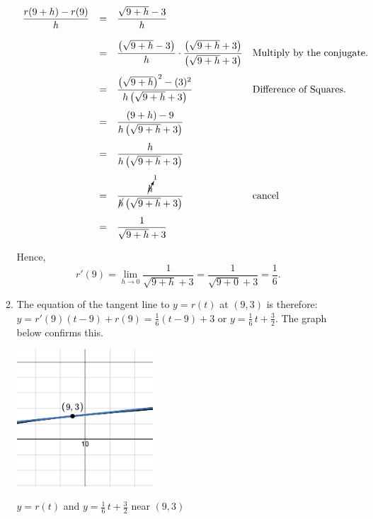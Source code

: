 \documentclass{ximera}
\begin{document}
\begin{example}
\begin{enumerate}
\begin{enumerate}
\[\begin{array}{rcll}
\dfrac{r(9+h) - r(9)}{h} & = & \dfrac{\sqrt{9+h} - 3}{h} & \\[15pt]
												
												 & = & \dfrac{\left(\sqrt{9+h} - 3 \right)}{h} \cdot \dfrac{\left(\sqrt{9+h} + 3\right)}{\left(\sqrt{9+h} + 3\right)} & \text{Multiply by the conjugate.} \\[15pt]
										
												 & = &  \dfrac{\left(\sqrt{9+h}\right)^2 -(3)^2}{h\left(\sqrt{9+h} + 3\right)} & \text{Difference of Squares.}\\[15pt]
												
												& = &  \dfrac{(9+h) - 9}{h\left(\sqrt{9+h} + 3\right)} & \\[15pt]
												
												 & = &  \dfrac{h}{h\left(\sqrt{9+h} + 3\right)} & \\[15pt]
												 
												 & = &  \dfrac{\cancelto{1}{h}}{\cancel{h}\left(\sqrt{9+h} + 3\right)} & \text{cancel} \\[15pt]
										
										
												 & = &  \dfrac{1}{\sqrt{9+h} +3} & \\ 
												\end{array}\]	


Hence, \[ r'(9) = \lim_{h \rightarrow 0} \frac{1}{\sqrt{9+h} +3} = \frac{1}{\sqrt{9+0} +3} = \frac{1}{6}.\]

\item  The equation of the tangent line to $y = r(t)$ at $(9,3)$ is therefore:  $y = r'(9)(t-9) + r(9) = \frac{1}{6} (t-9) + 3$ or $y = \frac{1}{6} \, t + \frac{3}{2}$. The graph below confirms this.

 \begin{center}

 \includegraphics[width=2in]{./IntroductiontoDerivativesGraphics/TLEx203.png} 
 
 $y =r(t)$ and   $y = \frac{1}{6} \, t + \frac{3}{2}$  near $(9,3)$  


\end{center}
\end{enumerate}
\end{enumerate}
\end{example}
\end{document}
